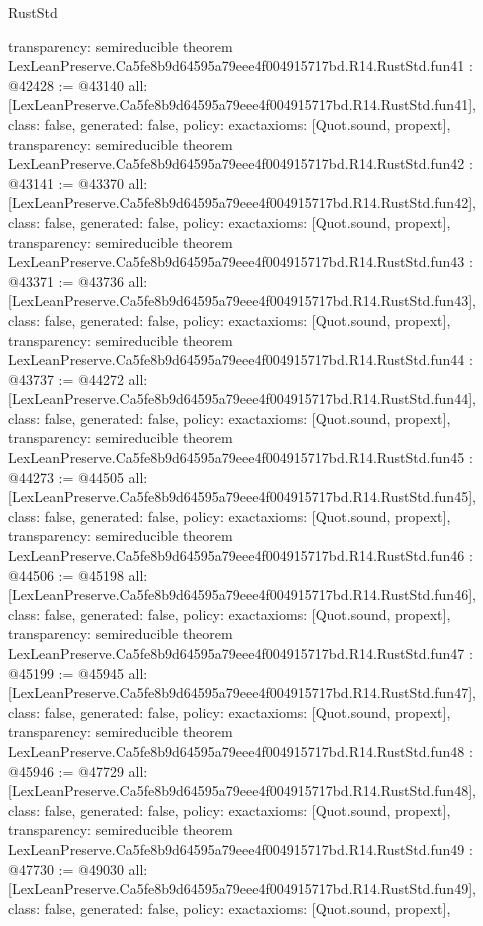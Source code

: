 \begin{lexlean}{RustStd}
\begin{coremodule}
{  transparency: semireducible
}
theorem LexLeanPreserve.Ca5fe8b9d64595a79eee4f004915717bd.R14.RustStd.fun41 : @42428 := @43140 {
  all: [LexLeanPreserve.Ca5fe8b9d64595a79eee4f004915717bd.R14.RustStd.fun41],
  class: false,
  generated: false,
  policy: exact{axioms: [Quot.sound, propext]},
  transparency: semireducible
}
theorem LexLeanPreserve.Ca5fe8b9d64595a79eee4f004915717bd.R14.RustStd.fun42 : @43141 := @43370 {
  all: [LexLeanPreserve.Ca5fe8b9d64595a79eee4f004915717bd.R14.RustStd.fun42],
  class: false,
  generated: false,
  policy: exact{axioms: [Quot.sound, propext]},
  transparency: semireducible
}
theorem LexLeanPreserve.Ca5fe8b9d64595a79eee4f004915717bd.R14.RustStd.fun43 : @43371 := @43736 {
  all: [LexLeanPreserve.Ca5fe8b9d64595a79eee4f004915717bd.R14.RustStd.fun43],
  class: false,
  generated: false,
  policy: exact{axioms: [Quot.sound, propext]},
  transparency: semireducible
}
theorem LexLeanPreserve.Ca5fe8b9d64595a79eee4f004915717bd.R14.RustStd.fun44 : @43737 := @44272 {
  all: [LexLeanPreserve.Ca5fe8b9d64595a79eee4f004915717bd.R14.RustStd.fun44],
  class: false,
  generated: false,
  policy: exact{axioms: [Quot.sound, propext]},
  transparency: semireducible
}
theorem LexLeanPreserve.Ca5fe8b9d64595a79eee4f004915717bd.R14.RustStd.fun45 : @44273 := @44505 {
  all: [LexLeanPreserve.Ca5fe8b9d64595a79eee4f004915717bd.R14.RustStd.fun45],
  class: false,
  generated: false,
  policy: exact{axioms: [Quot.sound, propext]},
  transparency: semireducible
}
theorem LexLeanPreserve.Ca5fe8b9d64595a79eee4f004915717bd.R14.RustStd.fun46 : @44506 := @45198 {
  all: [LexLeanPreserve.Ca5fe8b9d64595a79eee4f004915717bd.R14.RustStd.fun46],
  class: false,
  generated: false,
  policy: exact{axioms: [Quot.sound, propext]},
  transparency: semireducible
}
theorem LexLeanPreserve.Ca5fe8b9d64595a79eee4f004915717bd.R14.RustStd.fun47 : @45199 := @45945 {
  all: [LexLeanPreserve.Ca5fe8b9d64595a79eee4f004915717bd.R14.RustStd.fun47],
  class: false,
  generated: false,
  policy: exact{axioms: [Quot.sound, propext]},
  transparency: semireducible
}
theorem LexLeanPreserve.Ca5fe8b9d64595a79eee4f004915717bd.R14.RustStd.fun48 : @45946 := @47729 {
  all: [LexLeanPreserve.Ca5fe8b9d64595a79eee4f004915717bd.R14.RustStd.fun48],
  class: false,
  generated: false,
  policy: exact{axioms: [Quot.sound, propext]},
  transparency: semireducible
}
theorem LexLeanPreserve.Ca5fe8b9d64595a79eee4f004915717bd.R14.RustStd.fun49 : @47730 := @49030 {
  all: [LexLeanPreserve.Ca5fe8b9d64595a79eee4f004915717bd.R14.RustStd.fun49],
  class: false,
  generated: false,
  policy: exact{axioms: [Quot.sound, propext]},
}
\end{coremodule}
\end{lexlean}

